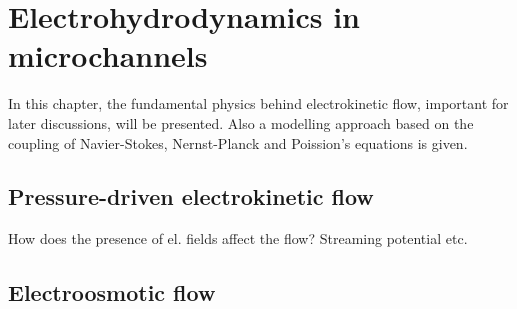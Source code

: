 \chapter{Electrohydrodynamics in microchannels}

In this chapter, the fundamental physics behind electrokinetic flow,
important for later discussions, will be presented. Also a modelling
approach based on the coupling of Navier-Stokes, Nernst-Planck and
Poission's equations is given.












\section{Pressure-driven electrokinetic flow}
How does the presence of el. fields affect the flow?
Streaming potential etc.

\section{Electroosmotic flow}




